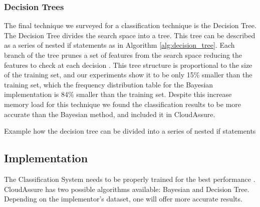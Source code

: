 \subsubsection{Decision Trees}
The final technique we surveyed for a classification technique is the Decision
Tree. The Decision Tree divides the search space into a tree. This tree can be
described as a series of nested if statements as in
Algorithm \ref{alg:decision_tree}. Each branch of the
tree prunes a set of features from the search space reducing the features to
check at each decision \autocite{Segaran2008}. This tree structure is
proportional to the size of the training set, and our experiments show it to be
only 15\% smaller than the training set, which the frequency distribution table
for the Bayesian implementation is 84\% smaller than the training set. Despite
this increase memory load for this technique we found the classification
results to be more accurate than the Bayesian method, and included it in
CloudAssure.

\begin{algorithm}
    \label{alg:decision_tree}
    \caption{Example how the decision tree can be divided into a series of
    nested if statements}
\begin{algorithmic}
                \EndIf
                \EndIf
                        \EndIf
                        \EndIf
                                \EndIf
                            \EndIf
                        \EndIf
                    \EndIf
                \EndIf
            \EndIf
        \EndIf
\end{algorithmic}
\end{algorithm}

\subsection{Implementation}
The Classification System
needs to be properly trained for the best performance \autocite{Russell2008}.
CloudAssure has two possible algorithms available: Bayesian and Decision Tree.
Depending on the implementor's dataset, one will offer more accurate results.

